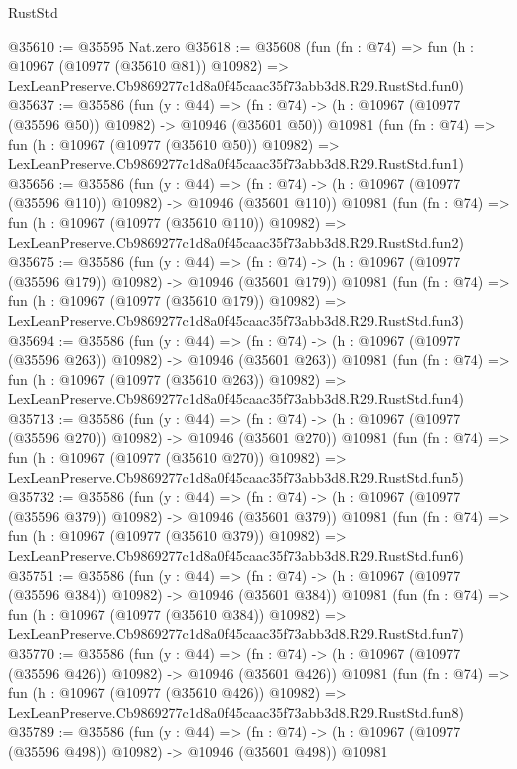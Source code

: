 \begin{lexlean}{RustStd}
\begin{coremodule}
@35610 := @35595 Nat.zero
@35618 := @35608
    (fun (fn : @74) =>
    fun (h : @10967 (@10977 (@35610 @81)) @10982) =>
    LexLeanPreserve.Cb9869277c1d8a0f45caac35f73abb3d8.R29.RustStd.fun0)
@35637 := @35586
    (fun (y : @44) =>
    (fn : @74) -> (h : @10967 (@10977 (@35596 @50)) @10982) -> @10946 (@35601 @50))
    @10981
    (fun (fn : @74) =>
    fun (h : @10967 (@10977 (@35610 @50)) @10982) =>
    LexLeanPreserve.Cb9869277c1d8a0f45caac35f73abb3d8.R29.RustStd.fun1)
@35656 := @35586
    (fun (y : @44) =>
    (fn : @74) -> (h : @10967 (@10977 (@35596 @110)) @10982) -> @10946 (@35601 @110))
    @10981
    (fun (fn : @74) =>
    fun (h : @10967 (@10977 (@35610 @110)) @10982) =>
    LexLeanPreserve.Cb9869277c1d8a0f45caac35f73abb3d8.R29.RustStd.fun2)
@35675 := @35586
    (fun (y : @44) =>
    (fn : @74) -> (h : @10967 (@10977 (@35596 @179)) @10982) -> @10946 (@35601 @179))
    @10981
    (fun (fn : @74) =>
    fun (h : @10967 (@10977 (@35610 @179)) @10982) =>
    LexLeanPreserve.Cb9869277c1d8a0f45caac35f73abb3d8.R29.RustStd.fun3)
@35694 := @35586
    (fun (y : @44) =>
    (fn : @74) -> (h : @10967 (@10977 (@35596 @263)) @10982) -> @10946 (@35601 @263))
    @10981
    (fun (fn : @74) =>
    fun (h : @10967 (@10977 (@35610 @263)) @10982) =>
    LexLeanPreserve.Cb9869277c1d8a0f45caac35f73abb3d8.R29.RustStd.fun4)
@35713 := @35586
    (fun (y : @44) =>
    (fn : @74) -> (h : @10967 (@10977 (@35596 @270)) @10982) -> @10946 (@35601 @270))
    @10981
    (fun (fn : @74) =>
    fun (h : @10967 (@10977 (@35610 @270)) @10982) =>
    LexLeanPreserve.Cb9869277c1d8a0f45caac35f73abb3d8.R29.RustStd.fun5)
@35732 := @35586
    (fun (y : @44) =>
    (fn : @74) -> (h : @10967 (@10977 (@35596 @379)) @10982) -> @10946 (@35601 @379))
    @10981
    (fun (fn : @74) =>
    fun (h : @10967 (@10977 (@35610 @379)) @10982) =>
    LexLeanPreserve.Cb9869277c1d8a0f45caac35f73abb3d8.R29.RustStd.fun6)
@35751 := @35586
    (fun (y : @44) =>
    (fn : @74) -> (h : @10967 (@10977 (@35596 @384)) @10982) -> @10946 (@35601 @384))
    @10981
    (fun (fn : @74) =>
    fun (h : @10967 (@10977 (@35610 @384)) @10982) =>
    LexLeanPreserve.Cb9869277c1d8a0f45caac35f73abb3d8.R29.RustStd.fun7)
@35770 := @35586
    (fun (y : @44) =>
    (fn : @74) -> (h : @10967 (@10977 (@35596 @426)) @10982) -> @10946 (@35601 @426))
    @10981
    (fun (fn : @74) =>
    fun (h : @10967 (@10977 (@35610 @426)) @10982) =>
    LexLeanPreserve.Cb9869277c1d8a0f45caac35f73abb3d8.R29.RustStd.fun8)
@35789 := @35586
    (fun (y : @44) =>
    (fn : @74) -> (h : @10967 (@10977 (@35596 @498)) @10982) -> @10946 (@35601 @498))
    @10981

\end{coremodule}
\end{lexlean}
